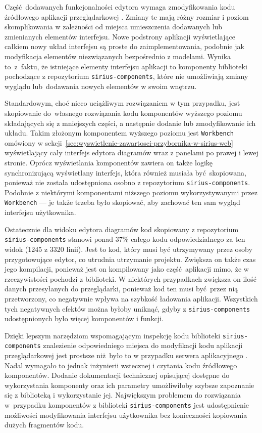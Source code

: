 Część dodawanych funkcjonalności edytora wymaga zmodyfikowania kodu źródłowego
aplikacji przeglądarkowej \SiriusWeb{}. Zmiany te mają różny rozmiar i
poziom skomplikowania w zależności od miejsca umieszczenia
dodawanych lub zmienianych elementów interfejsu.
Nowe podstrony aplikacji wyświetlające całkiem nowy układ interfejsu są proste
do zaimplementowania, podobnie jak modyfikacja elementów niezwiązanych
bezpośrednio z modelami. Wynika to~z~faktu, że istniejące elementy interfejsu
aplikacji \SiriusWeb{} to komponenty biblioteki \React{} pochodzące z
repozytorium \texttt{sirius-components}, które nie umożliwiają zmiany wyglądu
lub~dodawania nowych elementów w swoim wnętrzu.

Standardowym, choć nieco uciążliwym rozwiązaniem w tym przypadku, jest
skopiowanie do~własnego rozwiązania kodu komponentów wyższego poziomu
składających
się z mniejszych
części, a następnie dodanie lub zmodyfikowanie ich układu. Takim złożonym
komponentem wyższego poziomu jest \texttt{Workbench} omówiony w
sekcji~\ref{sec:wyswietlenie-zawartosci-przybornika-w-sirius-web} wyświetlający
cały interfejs edytora diagramów wraz z panelami po prawej i lewej stronie.
Oprócz wyświetlania komponentów zawiera on także logikę synchronizującą
wyświetlany interfejs,
która również musiała być~skopiowana, ponieważ nie została udostępniona osobno
z repozytorium \texttt{sirius-components}. Podobnie z niektórymi komponentami
niższego poziomu wykorzystywanymi przez \texttt{Workbench} --- je także trzeba
było skopiować, aby zachować ten sam wygląd interfejsu użytkownika.

Ostatecznie dla widoku edytora diagramów kod skopiowany z repozytorium
\texttt{sirius-\allowbreak components} %
stanowi ponad $37\%$ całego kodu
odpowiedzialnego za ten widok (1245 z 3320 linii). Jest to kod, który musi być
utrzymywany przez osoby przygotowujące edytor, co utrudnia utrzymanie projektu.
Zwiększa on także czas jego kompilacji, ponieważ jest on kompilowany jako
część aplikacji mimo, że w rzeczywistości pochodzi z biblioteki. W niektórych
przypadkach zwiększa on ilość danych przesyłanych do przeglądarki, ponieważ kod
ten musi być przez nią przetworzony, co negatywnie wpływa na szybkość ładowania
aplikacji. Wszystkich tych negatywnych efektów można byłoby uniknąć, gdyby z
\texttt{sirius-components} udostępnionych było więcej komponentów i funkcji.

Dzięki lepszym narzędziom wspomagającym inspekcję kodu biblioteki
\texttt{sirius-components} znalezienie odpowiedniego miejsca do modyfikacji
kodu aplikacji przeglądarkowej jest prostsze niż było to w przypadku serwera
aplikacyjnego \SiriusWeb{}. Nadal wymagało to jednak inżynierii wstecznej
i czytania kodu źródłowego komponentów. Dodanie dokumentacji technicznej
opisującej dostępne do wykorzystania komponenty oraz ich parametry umożliwiłoby
szybsze zapoznanie się z biblioteką i wykorzystanie jej. Największym problemem
do rozwiązania w~przypadku komponentów z biblioteki \texttt{sirius-components}
jest udostępnienie możliwości modyfikowania interfejsu użytkownika
bez konieczności kopiowania dużych fragmentów kodu.

